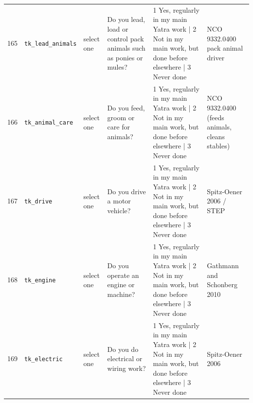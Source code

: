 \documentclass[9pt,a4paper,landscape]{article}
\begin{document}
\begin{longtable}{@{}p{0.5cm}p{3.3cm}p{1.7cm}p{7.3cm}p{5.6cm}p{5.4cm}@{}}
\footnotesize 165 & \footnotesize\texttt{tk\_lead\_animals} & \scriptsize select one & \footnotesize Do you lead, load or control pack animals such as ponies or mules? \par\vspace{1pt}{\footnotesize\color{hdr}{\hifont क्या आप घोड़े या खच्चर जैसे जानवरों को ले जाना या नियंत्रित करना का काम करते हैं? (1 अपने मुख्य यात्रा-काम में नियमित; 2 मुख्य काम में नहीं, पर पहले कहीं और किया है; 3 कभी नहीं)}} & \scriptsize 1 Yes, regularly in my main Yatra work | 2 Not in my main work, but done before elsewhere | 3 Never done & \scriptsize NCO 9332.0400 pack animal driver\\
\footnotesize 166 & \footnotesize\texttt{tk\_animal\_care} & \scriptsize select one & \footnotesize Do you feed, groom or care for animals? \par\vspace{1pt}{\footnotesize\color{hdr}{\hifont क्या आप जानवरों को खिलाना, सँवारना या उनकी देखभाल करना का काम करते हैं? (1 अपने मुख्य यात्रा-काम में नियमित; 2 मुख्य काम में नहीं, पर पहले कहीं और किया है; 3 कभी नहीं)}} & \scriptsize 1 Yes, regularly in my main Yatra work | 2 Not in my main work, but done before elsewhere | 3 Never done & \scriptsize NCO 9332.0400 (feeds animals, cleans stables)\\
\footnotesize 167 & \footnotesize\texttt{tk\_drive} & \scriptsize select one & \footnotesize Do you drive a motor vehicle? \par\vspace{1pt}{\footnotesize\color{hdr}{\hifont क्या आप गाड़ी चलाना का काम करते हैं? (1 अपने मुख्य यात्रा-काम में नियमित; 2 मुख्य काम में नहीं, पर पहले कहीं और किया है; 3 कभी नहीं)}} & \scriptsize 1 Yes, regularly in my main Yatra work | 2 Not in my main work, but done before elsewhere | 3 Never done & \scriptsize Spitz-Oener 2006 / STEP\\
\footnotesize 168 & \footnotesize\texttt{tk\_engine} & \scriptsize select one & \footnotesize Do you operate an engine or machine? \par\vspace{1pt}{\footnotesize\color{hdr}{\hifont क्या आप इंजन या मशीन चलाना का काम करते हैं? (1 अपने मुख्य यात्रा-काम में नियमित; 2 मुख्य काम में नहीं, पर पहले कहीं और किया है; 3 कभी नहीं)}} & \scriptsize 1 Yes, regularly in my main Yatra work | 2 Not in my main work, but done before elsewhere | 3 Never done & \scriptsize Gathmann and Schonberg 2010\\
\footnotesize 169 & \footnotesize\texttt{tk\_electric} & \scriptsize select one & \footnotesize Do you do electrical or wiring work? \par\vspace{1pt}{\footnotesize\color{hdr}{\hifont क्या आप बिजली या तार का काम करना का काम करते हैं? (1 अपने मुख्य यात्रा-काम में नियमित; 2 मुख्य काम में नहीं, पर पहले कहीं और किया है; 3 कभी नहीं)}} & \scriptsize 1 Yes, regularly in my main Yatra work | 2 Not in my main work, but done before elsewhere | 3 Never done & \scriptsize Spitz-Oener 2006\\

\end{longtable}
\end{document}
